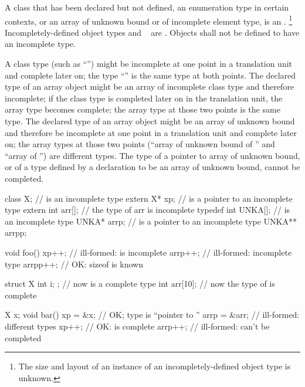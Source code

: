 \pnum
{}%
A class that has been declared but not defined, an enumeration type in certain
contexts, or an array of unknown
bound or of incomplete element type, is an
.%
\footnote{The size and layout of an instance of an incompletely-defined
object type is unknown.}
Incompletely-defined object types and \cv{}~ are
.
Objects shall not be defined to have an
incomplete type.

\pnum
A class type (such as ``'') might be incomplete at one
point in a translation unit and complete later on; the type
``'' is the same type at both points. The declared type
of an array object might be an array of incomplete class type and
therefore incomplete; if the class type is completed later on in the
translation unit, the array type becomes complete; the array type at
those two points is the same type. The declared type of an array object
might be an array of unknown bound and therefore be incomplete at one
point in a translation unit and complete later on; the array types at
those two points (``array of unknown bound of '' and ``array of
 '') are different types. The type of a pointer to array of
unknown bound, or of a type defined by a  declaration to
be an array of unknown bound, cannot be completed.
\begin{example}
%
\begin{codeblock}
class X;                        //  is an incomplete type
extern X* xp;                   //  is a pointer to an incomplete type
extern int arr[];               // the type of arr is incomplete
typedef int UNKA[];             //  is an incomplete type
UNKA* arrp;                     //  is a pointer to an incomplete type
UNKA** arrpp;

void foo() {
  xp++;                         // ill-formed:  is incomplete
  arrp++;                       // ill-formed: incomplete type
  arrpp++;                      // OK: sizeof  is known
}

struct X { int i; };            // now  is a complete type
int  arr[10];                   // now the type of  is complete

X x;
void bar() {
  xp = &x;                      // OK; type is ``pointer to ''
  arrp = &arr;                  // ill-formed: different types
  xp++;                         // OK:   is complete
  arrp++;                       // ill-formed:  can't be completed
}
\end{codeblock}
\end{example}


